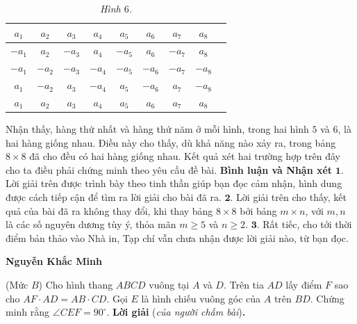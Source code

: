 \begin{multicols}{2}
	\begin{table}[H]
		\vspace*{-5pt}
		\centering
		\captionsetup{labelformat= empty, justification=centering}
		\renewcommand{\arraystretch}{1.2}
		\setlength{\tabcolsep}{2pt}
		\begin{tabular}{|c|c|c|c|c|c|c|c|c|}
			\hline
			$a_1$ & $a_2$ & $a_3$ & $a_4$ & $a_5$ & $a_6$ & $a_7$ & $a_8$ \\
			\hline
			$-a_1$ & $a_2$ & $-a_3$ & $a_4$ & $-a_5$ & $a_6$ & $-a_7$ & $a_8$ \\
			\hline
			$-a_1$ & $-a_2$ & $-a_3$ & $-a_4$ & $-a_5$ & $-a_6$ & $-a_7$ & $-a_8$ \\
			\hline
			$a_1$ & $-a_2$ & $a_3$ & $-a_4$ & $a_5$ & $-a_6$ & $a_7$ & $-a_8$ \\
			\hline
			$a_1$ & $a_2$ & $a_3$ & $a_4$ & $a_5$ & $a_6$ & $a_7$ & $a_8$ \\
			\hline
		\end{tabular}
		\caption{\small\textit{\color{thachthuctoanhoc}Hình $6$.}}
		\vspace*{-10pt}
	\end{table}
	Nhận thấy, hàng thứ nhất và hàng thứ năm ở mỗi hình, trong hai hình $5$ và $6$, là hai hàng giống nhau. Điều này cho thấy, dù khả năng nào xảy ra, trong bảng $8 \times  8$ đã cho đều có hai hàng giống nhau.
	\vskip 0.05cm
	Kết quả xét hai trường hợp trên đây cho ta điều phải chứng minh theo yêu cầu đề bài.
	\vskip 0.05cm
	\textbf{\color{thachthuctoanhoc}Bình luận và Nhận xét}
	\vskip 0.05cm
	$\pmb{1.}$ Lời giải trên được trình bày theo tinh thần giúp bạn đọc cảm nhận, hình dung được cách tiếp cận để tìm ra lời giải cho bài đã ra.
	\vskip 0.05cm
	$\pmb{2.}$ Lời giải trên cho thấy, kết quả của bài đã ra không thay đổi, khi thay bảng $8 \times  8$ bởi bảng $m \times  n$, với $m, n$ là các số nguyên dương tùy ý, thỏa mãn $m \ge  5$ và $n \ge  2$.
	\vskip 0.05cm
	$\pmb{3.}$ Rất tiếc, cho tới thời điểm bản thảo vào Nhà in, Tạp chí vẫn chưa nhận được lời giải nào, từ bạn đọc.
	\begin{flushright}
		\textbf{\color{thachthuctoanhoc}Nguyễn Khắc Minh}
	\end{flushright}
	{}
	(Mức $B$) Cho hình thang $ABCD$ vuông tại $A$ và $D$. Trên tia $AD$ lấy điểm $F$ sao cho $AF\cdot AD=AB\cdot CD$. Gọi $E$ là hình chiếu vuông góc của $A$ trên $BD$. Chứng minh rằng $\angle CEF=90^\circ$. 
	\vskip 0.05cm
	\textbf{\color{thachthuctoanhoc}Lời giải} (\textit{của người chấm bài})\textbf{\color{thachthuctoanhoc}.}

\end{multicols}
